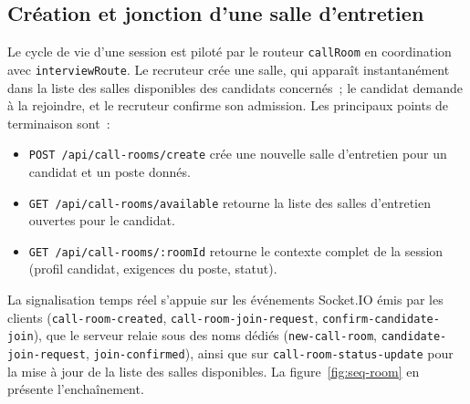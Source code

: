 \subsection{Création et jonction d'une salle d'entretien}

Le cycle de vie d'une session est piloté par le routeur \texttt{callRoom} en coordination avec \texttt{interviewRoute}. Le recruteur crée une salle, qui apparaît instantanément dans la liste des salles disponibles des candidats concernés~; le candidat demande à la rejoindre, et le recruteur confirme son admission. Les principaux points de terminaison sont~:

\begin{itemize}
  \item \texttt{POST /api/call-rooms/create} crée une nouvelle salle d'entretien pour un candidat et un poste donnés.
  \item \texttt{GET /api/call-rooms/available} retourne la liste des salles d'entretien ouvertes pour le candidat.
  \item \texttt{GET /api/call-rooms/:roomId} retourne le contexte complet de la session (profil candidat, exigences du poste, statut).
\end{itemize}

\noindent La signalisation temps réel s'appuie sur les événements Socket.IO émis par les clients (\texttt{call-\allowbreak room-\allowbreak created}, \texttt{call-\allowbreak room-\allowbreak join-\allowbreak request}, \texttt{confirm-\allowbreak candidate-\allowbreak join}), que le serveur relaie sous des noms dédiés (\texttt{new-\allowbreak call-\allowbreak room}, \texttt{candidate-\allowbreak join-\allowbreak request}, \texttt{join-\allowbreak confirmed}), ainsi que sur \texttt{call-\allowbreak room-\allowbreak status-\allowbreak update} pour la mise à jour de la liste des salles disponibles. La figure~\ref{fig:seq-room} en présente l'enchaînement.

